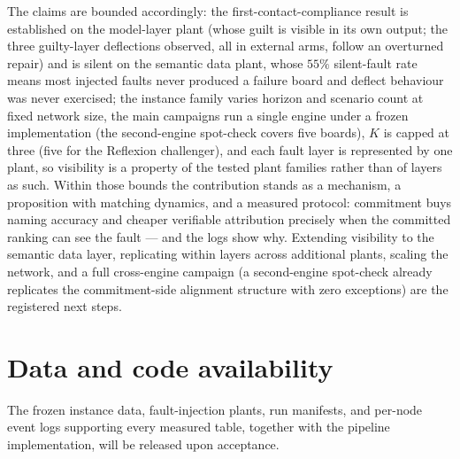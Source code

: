 \documentclass[a4paper,fleqn]{cas-sc}
\begin{document}
The claims are bounded accordingly: the first-contact-compliance result
is established on the model-layer plant (whose guilt is visible in its own
output; the three guilty-layer deflections observed, all in external
arms, follow an overturned repair) and is silent on the semantic data
plant, whose $55\%$
silent-fault rate means most injected faults never produced a failure
board and deflect behaviour was never exercised; the instance family
varies horizon and scenario count at fixed network size, the main
campaigns run a single engine under a frozen implementation (the
second-engine spot-check covers five boards), $K$ is capped at three
(five for the Reflexion challenger), and each fault layer is represented
by one plant, so visibility is a property of the tested plant families
rather than of layers as such. Within those bounds the
contribution stands as a mechanism, a proposition with matching
dynamics, and a measured protocol: commitment buys naming accuracy and
cheaper verifiable attribution precisely when the committed ranking can
see the fault --- and the logs show why. Extending visibility to the
semantic data layer, replicating within layers across additional plants,
scaling the network, and a full cross-engine
campaign (a second-engine spot-check already replicates the
commitment-side alignment structure with zero exceptions) are the
registered next steps.

\section*{Data and code availability}
The frozen instance data, fault-injection plants, run manifests, and
per-node event logs supporting every measured table, together with the
pipeline implementation, will be released upon acceptance.
\end{document}
